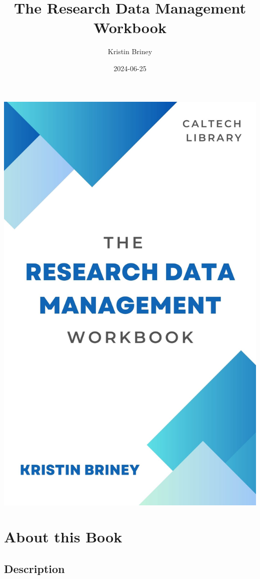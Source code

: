 \documentclass[
]{book}
\title{The Research Data Management Workbook}
\author{Kristin Briney}
\date{2024-06-25}
\begin{document}
\maketitle

\includegraphics{./images/cover.jpg}

{
\setcounter{tocdepth}{1}
\tableofcontents
}
\hypertarget{about-this-book}{%
\chapter*{About this Book}\label{about-this-book}}

\hypertarget{description}{%
\section*{Description}\label{description}}
\end{document}
